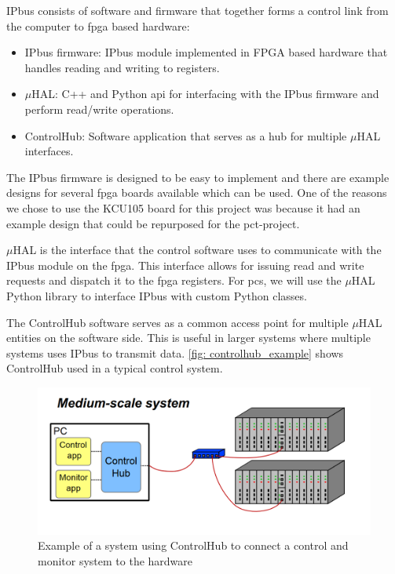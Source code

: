 \documentclass[main.tex]{subfiles}
\begin{document}
IPbus consists of software and firmware that together forms a control link from the computer to \gls{fpga} based hardware:

\begin{itemize}
    \item IPbus firmware: IPbus module implemented in FPGA based hardware that handles reading and writing to registers.
    \item $\mu$HAL: C++ and Python \gls{api} for interfacing with the IPbus firmware and perform read/write operations.
    \item ControlHub: Software application that serves as a hub for multiple $\mu$HAL interfaces.
\end{itemize}  

The IPbus firmware is designed to be easy to implement and there are example designs for several \gls{fpga} boards available which can be used. One of the reasons we chose to use the KCU105 board for this project was because it had an example design that could be repurposed for the \gls{pct}-project.

$\mu$HAL is the interface that the control software uses to communicate with the IPbus module on the \gls{fpga}. This interface allows for issuing read and write requests and dispatch it to the \gls{fpga} registers. For \gls{pcs}, we will use the $\mu$HAL Python library to interface IPbus with custom Python classes.

The ControlHub software serves as a common access point for multiple $\mu$HAL entities on the software side. This is useful in larger systems where multiple systems uses IPbus to transmit data. \autoref{fig: controlhub_example} shows ControlHub used in a typical control system.

\begin{figure}[!htpb]
    \centering
    \includegraphics[scale=0.3]{images/controlhub_example.png}
    \caption{Example of a system using ControlHub to connect a control and monitor system to the hardware\cite{IPbus}}
    \label{fig: controlhub_example}
\end{figure}
\FloatBarrier
\end{document}
